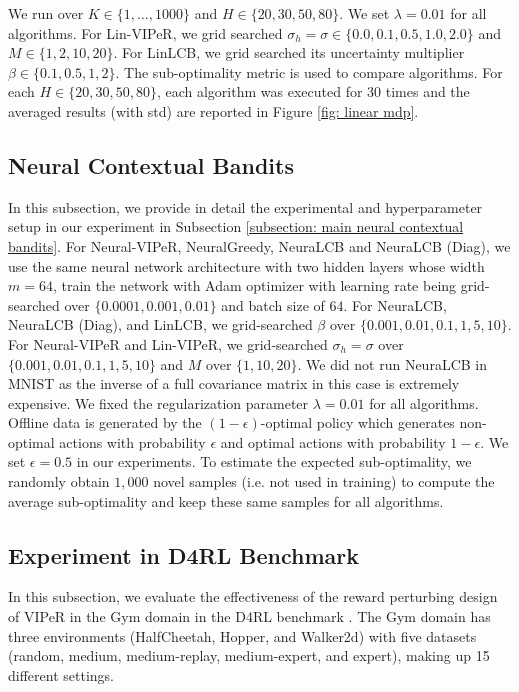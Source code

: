 \documentclass{article} \usepackage{iclr2023/iclr2023_conference,times}
\begin{document}
We run over $K \in \{1, \ldots, 1000\}$ and $H \in \{20, 30, 50, 80\}$. We set $\lambda = 0.01$ for all algorithms. For Lin-VIPeR, we grid searched $\sigma_h = \sigma \in \{0.0, 0.1, 0.5, 1.0, 2.0\}$ and $M \in \{1,2,10,20\}$. For LinLCB, we grid searched its uncertainty multiplier $\beta \in \{0.1, 0.5, 1, 2\}$. The sub-optimality metric is used to compare algorithms. For each $H \in \{20, 30, 50, 80\}$, each algorithm was executed for $30$ times and the averaged results (with std) are reported in Figure \ref{fig: linear mdp}. 

\subsection{Neural Contextual Bandits}
\label{subsection: extended page for neural contextual bandit experiment}
In this subsection, we provide in detail the experimental and hyperparameter setup in our experiment in Subsection \ref{subsection: main neural contextual bandits}. For Neural-VIPeR, NeuralGreedy, NeuraLCB and NeuraLCB (Diag), we use the same neural network architecture with two hidden layers whose width $m = 64$, train the network with Adam optimizer \citep{kingma2014adam} with learning rate being grid-searched over $\{0.0001, 0.001, 0.01\}$ and batch size of $64$. For NeuraLCB, NeuraLCB (Diag), and LinLCB, we grid-searched $\beta$ over $\{0.001, 0.01, 0.1, 1, 5, 10\}$. For Neural-VIPeR and Lin-VIPeR, we grid-searched $\sigma_h = \sigma$ over $\{0.001, 0.01, 0.1, 1, 5, 10\}$ and $M$ over $\{1, 10, 20\}$. We did not run NeuraLCB in MNIST as the inverse of a full covariance matrix in this case is extremely expensive. We fixed the regularization parameter $\lambda = 0.01$ for all algorithms. Offline data is generated by the $(1-\epsilon)$-optimal policy which generates non-optimal actions with probability $\epsilon$ and optimal actions with probability $1 - \epsilon$. We set $\epsilon = 0.5$ in our experiments. To estimate the expected sub-optimality, we randomly obtain $1,000$ novel samples (i.e. not used in training) to compute the average sub-optimality and keep these same samples for all algorithms. 

\subsection{Experiment in D4RL Benchmark}
\label{subsection: d4rl}
In this subsection, we evaluate the effectiveness of the reward perturbing design of VIPeR in the Gym domain in the D4RL benchmark \citep{DBLP:journals/corr/abs-2004-07219}. The Gym domain has three environments (HalfCheetah, Hopper, and Walker2d) with five datasets (random, medium, medium-replay, medium-expert, and expert), making up 15 different settings.
\end{document}
